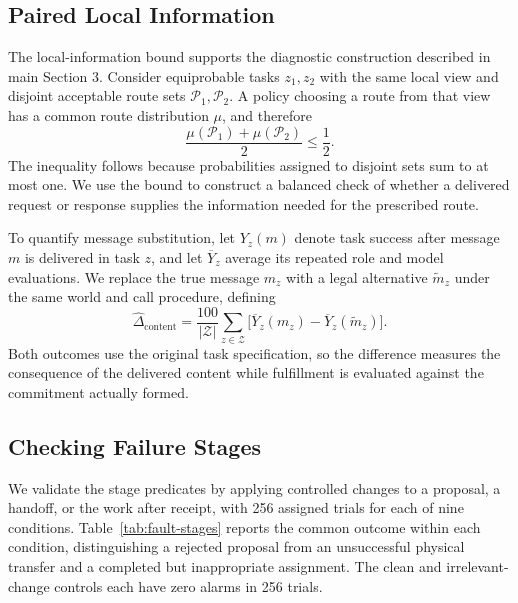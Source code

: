 \documentclass[sigconf,nonacm,balance=false]{aamas}
\begin{document}
\subsection{Paired Local Information}
\label{sec:supp-ambiguity}
The local-information bound supports the diagnostic construction described in main Section 3. Consider equiprobable tasks $z_1,z_2$ with the same local view and disjoint acceptable route sets $\mathcal P_1,\mathcal P_2$. A policy choosing a route from that view has a common route distribution $\mu$, and therefore
\[
\frac{\mu(\mathcal P_1)+\mu(\mathcal P_2)}{2}\leq\frac12.
\]
The inequality follows because probabilities assigned to disjoint sets sum to at most one. We use the bound to construct a balanced check of whether a delivered request or response supplies the information needed for the prescribed route.

To quantify message substitution, let $Y_z(m)$ denote task success after message $m$ is delivered in task $z$, and let $\overline Y_z$ average its repeated role and model evaluations. We replace the true message $m_z$ with a legal alternative $\widetilde m_z$ under the same world and call procedure, defining
\begin{equation}\label{eq:supp-content-effect}
\widehat\Delta_{\mathrm{content}}=\frac{100}{|\mathcal Z|}\sum_{z\in\mathcal Z}\big[\overline Y_z(m_z)-\overline Y_z(\widetilde m_z)\big].
\end{equation}
Both outcomes use the original task specification, so the difference measures the consequence of the delivered content while fulfillment is evaluated against the commitment actually formed.

\subsection{Checking Failure Stages}
\label{sec:supp-fault-checks}
We validate the stage predicates by applying controlled changes to a proposal, a handoff, or the work after receipt, with 256 assigned trials for each of nine conditions. Table~\ref{tab:fault-stages} reports the common outcome within each condition, distinguishing a rejected proposal from an unsuccessful physical transfer and a completed but inappropriate assignment. The clean and irrelevant-change controls each have zero alarms in 256 trials.
\end{document}
